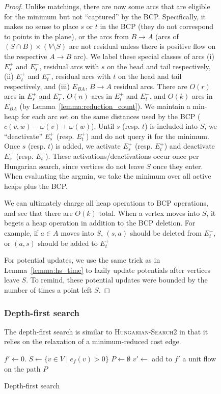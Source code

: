 \documentclass[11pt]{article}
\theoremstyle{plain}
\begin{document}
\begin{figure*}
\begin{proof}
	Unlike matchings, there are now some arcs that are eligible for the
	minimum but not ``captured'' by the BCP.
	Specifically, it makes no sense to place $s$ or $t$ in the BCP
	(they do not correspond to points in the plane), or the arcs from
	$B \to A$ (arcs of $(S \cap B) \times (V \setminus S)$ are not residual
	unless there is positive flow on the respective $A \to B$ arc).
	We label these special classes of arcs (i) $E_s^+$ and $E_s^-$,
	residual arcs with $s$ on the head and tail respectively, (ii)
	$E_t^+$ and $E_t^-$, residual arcs with $t$ on the head and tail
	respectively, and (iii) $E_{BA}$, $B \to A$ residual arcs.
	There are $O(r)$ arcs in $E_s^+$ and $E_s^-$, $O(n)$ arcs in $E_t^+$
	and $E_t^-$, and $O(k)$ arcs in $E_{BA}$
	(by Lemma~\ref{lemma:reduction_count}).
	We maintain a min-heap for each arc set on the same distances used
	by the BCP ($c(v, w) - \omega(v) + \omega(w)$).
	Until $s$ (resp. $t$) is included into $S$, we ``deactivate'' $E_s^+$
	(resp. $E_t^+$) and do not query it for the minimum.
	Once $s$ (resp. $t$) is added, we activate $E_s^+$ (resp. $E_t^+$) and
	deactivate $E_s^-$ (resp. $E_t^-$).
	These activations/deactivations occur once per Hungarian search, since
	vertices do not leave $S$ once they enter.
	When evaluating the argmin, we take the minimum over all active heaps
	plus the BCP.

	We can ultimately charge all heap operations to BCP operations, and
	see that there are $O(k)$ total.
	When a vertex moves into $S$, it begets a heap operation in addition
	to the BCP deletion.
	For example, if $a \in A$ moves into $S$, $(s, a)$ should be deleted
	from $E_t^-$, or $(a, s)$ should be added to $E_t^+$


	For potential updates, we use the same trick as in
	Lemma~\ref{lemma:hs_time} to lazily update potentials after vertices
	leave $S$.
	To remind, these potential updates were bounded by the number of times
	a point left $S$.

\end{proof}


\subsubsection{Depth-first search}

The depth-first search is similar to \textsc{Hungarian-Search2} in that it
relies on the relaxation of a minimum-reduced cost edge.
\begin{algorithm}
\caption{Depth-first search}
\begin{algorithmic}[1]
	\State $f' \gets 0$.
	\State $S \gets \{v \in V \mid e_f(v) > 0\}$
	\State $P \gets \emptyset$
	\Repeat
		\State $v' \gets$ 
			\State add to $f'$ a unit flow on the path $P$


\end{algorithmic}
\end{algorithm}
\end{figure*}
\end{document}
